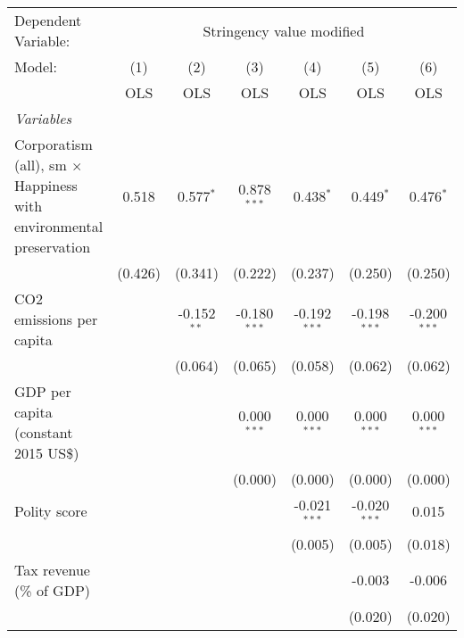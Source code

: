 
\begingroup
\centering
\begin{tabular}{lcccccc}
   \toprule
   Dependent Variable: & \multicolumn{6}{c}{Stringency value modified}\\
   Model:                                                                    & (1)     & (2)           & (3)            & (4)            & (5)            & (6)\\  
                                                                             &  OLS    & OLS           & OLS            & OLS            & OLS            & OLS\\  
   \midrule
   \emph{Variables}\\
   Corporatism (all), sm $\times$ Happiness with environmental preservation  & 0.518   & 0.577$^{*}$   & 0.878$^{***}$  & 0.438$^{*}$    & 0.449$^{*}$    & 0.476$^{*}$\\   
                                                                             & (0.426) & (0.341)       & (0.222)        & (0.237)        & (0.250)        & (0.250)\\   
   CO2 emissions per capita                                                  &         & -0.152$^{**}$ & -0.180$^{***}$ & -0.192$^{***}$ & -0.198$^{***}$ & -0.200$^{***}$\\   
                                                                             &         & (0.064)       & (0.065)        & (0.058)        & (0.062)        & (0.062)\\   
   GDP per capita (constant 2015 US\$)                                       &         &               & 0.000$^{***}$  & 0.000$^{***}$  & 0.000$^{***}$  & 0.000$^{***}$\\   
                                                                             &         &               & (0.000)        & (0.000)        & (0.000)        & (0.000)\\   
   Polity score                                                              &         &               &                & -0.021$^{***}$ & -0.020$^{***}$ & 0.015\\   
                                                                             &         &               &                & (0.005)        & (0.005)        & (0.018)\\   
   Tax revenue (\% of GDP)                                                   &         &               &                &                & -0.003         & -0.006\\   
                                                                             &         &               &                &                & (0.020)        & (0.020)\\   

\end{tabular}
